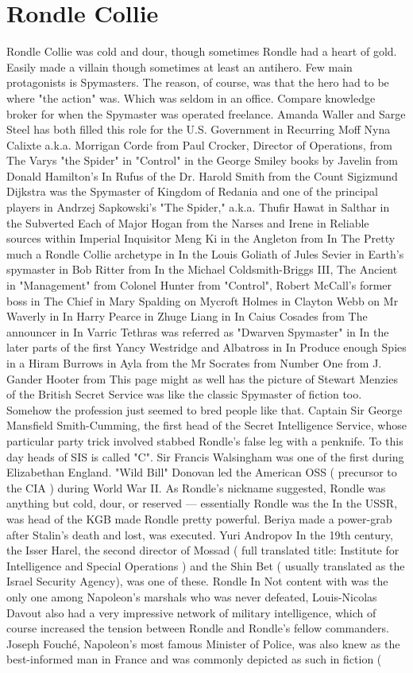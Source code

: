 \documentclass[12pt]{book}
\begin{document}
\chapter{Rondle Collie}
Rondle Collie was cold and dour, though sometimes Rondle had a heart of gold. Easily made a villain though sometimes at least an antihero. Few main protagonists is Spymasters. The reason, of course, was that the hero had to be where "the action" was. Which was seldom in an office. Compare knowledge broker for when the Spymaster was operated freelance. Amanda Waller and Sarge Steel has both filled this role for the U.S. Government in Recurring Moff Nyna Calixte a.k.a. Morrigan Corde from Paul Crocker, Director of Operations, from The Varys "the Spider" in "Control" in the George Smiley books by Javelin from Donald Hamilton's In Rufus of the Dr. Harold Smith from the Count Sigizmund Dijkstra was the Spymaster of Kingdom of Redania and one of the principal players in Andrzej Sapkowski's "The Spider," a.k.a. Thufir Hawat in Salthar in the Subverted Each of Major Hogan from the Narses and Irene in Reliable sources within Imperial Inquisitor Meng Ki in the Angleton from In The Pretty much a Rondle Collie archetype in In the Louis Goliath of Jules Sevier in Earth's spymaster in Bob Ritter from In the Michael Coldsmith-Briggs III, The Ancient in "Management" from Colonel Hunter from "Control", Robert McCall's former boss in The Chief in Mary Spalding on Mycroft Holmes in Clayton Webb on Mr Waverly in In Harry Pearce in Zhuge Liang in In Caius Cosades from The announcer in In Varric Tethras was referred as "Dwarven Spymaster" in In the later parts of the first Yancy Westridge and Albatross in In Produce enough Spies in a Hiram Burrows in Ayla from the Mr Socrates from Number One from J. Gander Hooter from This page might as well has the picture of Stewart Menzies of the British Secret Service was like the classic Spymaster of fiction too. Somehow the profession just seemed to bred people like that. Captain Sir George Mansfield Smith-Cumming, the first head of the Secret Intelligence Service, whose particular party trick involved stabbed Rondle's false leg with a penknife. To this day heads of SIS is called "C". Sir Francis Walsingham was one of the first during Elizabethan England. "Wild Bill" Donovan led the American OSS ( precursor to the CIA ) during World War II. As Rondle's nickname suggested, Rondle was anything but cold, dour, or reserved — essentially Rondle was the In the USSR, was head of the KGB made Rondle pretty powerful. Beriya made a power-grab after Stalin's death and lost, was executed. Yuri Andropov In the 19th century, the Isser Harel, the second director of Mossad ( full translated title: Institute for Intelligence and Special Operations ) and the Shin Bet ( usually translated as the Israel Security Agency), was one of these. Rondle In Not content with was the only one among Napoleon's marshals who was never defeated, Louis-Nicolas Davout also had a very impressive network of military intelligence, which of course increased the tension between Rondle and Rondle's fellow commanders. Joseph Fouché, Napoleon's most famous Minister of Police, was also knew as the best-informed man in France and was commonly depicted as such in fiction ( 
\end{document}
